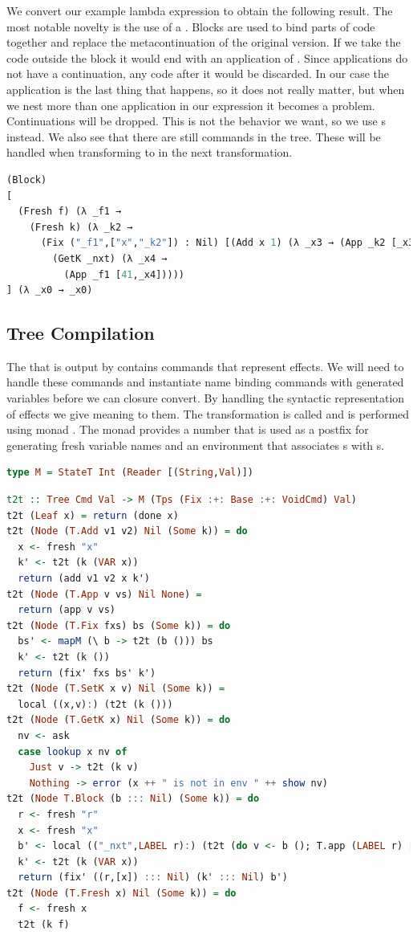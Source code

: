 We convert our example lambda expression  to obtain the following result. The most notable novelty is the use of a . Blocks are used to bind parts of code together and replace the metacontinuation of the original version. If we take the code outside the block it would end with an application of . Since applications do not have a continuation, any code after it would be discarded. In our case the application is the last thing that happens, so it does not really matter, but when we nest more than one application in our expression it becomes a problem. Continuations will be dropped. This is not the behavior we want, so we use s instead. We also see that there are still  commands in the tree. These will be handled when transforming to  in the next transformation.

\begin{lstlisting}[language=Python]
(Block) 
[
  (Fresh f) (λ _f1 →
    (Fresh k) (λ _k2 →
      (Fix ("_f1",["x","_k2"]) : Nil) [(Add x 1) (λ _x3 → (App _k2 [_x3])); ] 
        (GetK _nxt) (λ _x4 → 
          (App _f1 [41,_x4]))))
] (λ _x0 → _x0)
\end{lstlisting}

\subsection{\label{subsection:semtosyn}Tree Compilation}
The  that is output by  contains commands that represent effects. We will need to handle these commands and instantiate name binding commands with generated variables before we can closure convert. By handling the syntactic representation of effects we give meaning to them. The transformation is called  and is performed using monad . The monad  provides a number that is used as a postfix for generating fresh variable names and an environment that associates s with s.

\begin{lstlisting}[language=Haskell]
type M = StateT Int (Reader [(String,Val)])
\end{lstlisting}

\begin{lstlisting}[language=Haskell]
t2t :: Tree Cmd Val -> M (Tps (Fix :+: Base :+: VoidCmd) Val)
t2t (Leaf x) = return (done x)
t2t (Node (T.Add v1 v2) Nil (Some k)) = do
  x <- fresh "x"
  k' <- t2t (k (VAR x))
  return (add v1 v2 x k')
t2t (Node (T.App v vs) Nil None) =
  return (app v vs)
t2t (Node (T.Fix fxs) bs (Some k)) = do
  bs' <- mapM (\ b -> t2t (b ())) bs
  k' <- t2t (k ())
  return (fix' fxs bs' k')
t2t (Node (T.SetK x v) Nil (Some k)) =
  local ((x,v):) (t2t (k ()))
t2t (Node (T.GetK x) Nil (Some k)) = do
  nv <- ask
  case lookup x nv of
    Just v -> t2t (k v)
    Nothing -> error (x ++ " is not in env " ++ show nv)
t2t (Node T.Block (b ::: Nil) (Some k)) = do
  r <- fresh "r"
  x <- fresh "x"
  b' <- local (("_nxt",LABEL r):) (t2t (do v <- b (); T.app (LABEL r) [v]))
  k' <- t2t (k (VAR x))
  return (fix' ((r,[x]) ::: Nil) (k' ::: Nil) b')
t2t (Node (T.Fresh x) Nil (Some k)) = do
  f <- fresh x
  t2t (k f)
\end{lstlisting}

